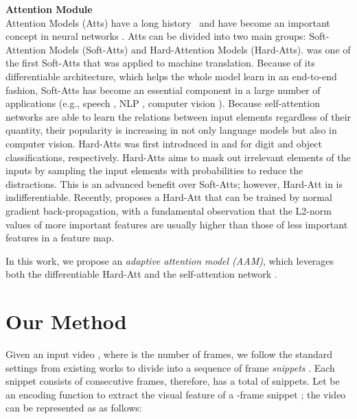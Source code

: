 \documentclass[sn-mathphys]{sn-jnl}
\theoremstyle{thmstyleone}\newtheorem{theorem}{Theorem}\newtheorem{proposition}[theorem]{Proposition}
\theoremstyle{thmstyletwo}\newtheorem{example}{Example}\newtheorem{remark}{Remark}
\theoremstyle{thmstylethree}\newtheorem{definition}{Definition}
\begin{document}
\vspace{0.2cm}
\noindent
\textbf{Attention Module} \\
Attention Models (Atts) have a long history~\cite{itti1998model} and have become an important concept in neural networks \cite{chaudhari2021attentive}. Atts can be divided into two main groups: Soft-Attention Models (Soft-Atts) and Hard-Attention Models (Hard-Atts). \cite{bahdanau2014neural} was one of the first Soft-Atts that was applied to machine translation. Because of its differentiable architecture, which helps the whole model learn in an end-to-end fashion, Soft-Atts has become an essential component in a large number of applications (e.g., speech \cite{cho2015describing}, NLP \cite{galassi2020attention}, computer vision \cite{chaudhari2019attentive}).
Because self-attention networks \cite{attention_is_all_you_need} are able to learn the relations between input elements regardless of their quantity, their popularity is increasing in not only language models but also in computer vision.
Hard-Atts was first introduced in \cite{xu2015show} and \cite{Saccader_NIPS2019} for digit and object classifications, respectively. 
Hard-Atts aims to mask out irrelevant elements of the inputs by sampling the input elements with probabilities to reduce the distractions. This is an advanced benefit over Soft-Atts; however, Hard-Att in \cite{xu2015show} is indifferentiable. Recently, \cite{patro2018differential} proposes a Hard-Att that can be trained by normal gradient back-propagation, with a fundamental observation that the L2-norm values of more important features are usually higher than those of less important features in a feature map.

In this work, we propose an \emph{adaptive attention model (AAM)}, which leverages both the differentiable Hard-Att \cite{patro2018differential} and the self-attention network \cite{attention_is_all_you_need}.


\section{Our Method}


Given an input video , where  is the number of frames, we follow the standard settings from existing works to divide  into a sequence of frame \textit{snippets} . Each snippet  consists of  consecutive frames, therefore,  has a total of  snippets. Let  be an encoding function to extract the visual feature  of a -frame snippet ; the video  can be represented as  as follows:
\end{document}
